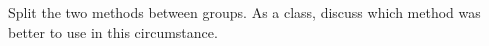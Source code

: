 \documentclass[handout]{ximera}
\begin{document}
\begin{instructorNotes}
Split the two methods between groups.  As a class, discuss which method was better to use in this circumstance.
\end{instructorNotes}



















	
	
	
	
	
	
	
	
	

	










								
				
				
	
\end{document}
